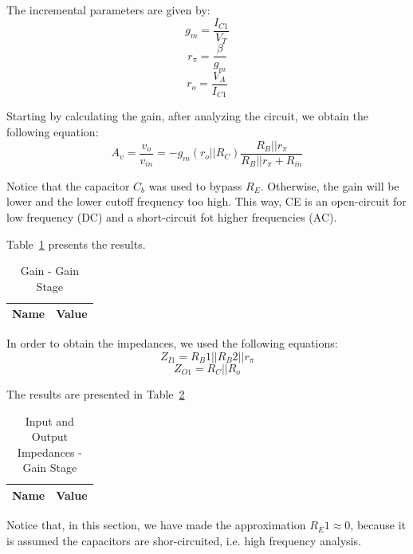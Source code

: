The incremental parameters are given by:
\begin{equation}
	g_m=\frac{I_{C1}}{V_{T}}
\end{equation}
\begin{equation}
	r_\pi=\frac{\beta}{g_m}
\end{equation}
\begin{equation}
	r_o=\frac{V_{A}}{I_{C1}}
\end{equation}

Starting by calculating the gain, after analyzing the circuit, we obtain the following equation: 
\begin{equation}
	A_v=\frac{v_o}{v_{in}}=-g_m(r_o||R_C)\frac{R_B||r_\pi}{R_B||r_\pi+R_{in}}
\end{equation}

Notice that the capacitor $C_b$ was used to bypass $R_E$. Otherwise, the gain will be lower and the lower cutoff frequency too high. This way, CE is an open-circuit for low frequency (DC) and a short-circuit fot higher frequencies (AC).

Table~\ref{tab:avgs} presents the results.

\begin{table}[H]
  \centering
  \begin{tabular}{|l|r|}
     \hline    
    {\bf Name} & {\bf Value} \\ \hline   
    
  \end{tabular}
  \caption{Gain - Gain Stage}
  \label{tab:avgs}
\end{table}

In order to obtain the impedances, we used the following equations:
\begin{equation}
	Z_{I1}=R_B1||R_B2||r_\pi
\end{equation}
\begin{equation}
	Z_{O1}=R_C||R_o
\end{equation}

The results are presented in Table~\ref{tab:zgs}
\begin{table}[H]
  \centering
  \begin{tabular}{|l|r|}
     \hline    
    {\bf Name} & {\bf Value} \\ \hline   
    
  \end{tabular}
  \caption{Input and Output Impedances - Gain Stage}
  \label{tab:zgs}
\end{table}

Notice that, in this section, we have made the approximation $R_E1 \approx 0$, because it is assumed the capacitors are shor-circuited, i.e. high frequency analysis.

